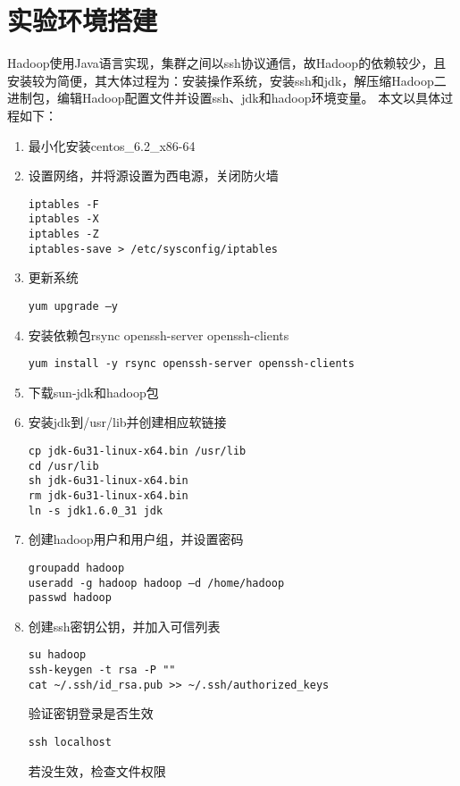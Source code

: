 \chapter[实验环境搭建]{实验环境搭建}
\label{chap:fuluA}
Hadoop使用Java语言实现，集群之间以ssh协议通信，故Hadoop的依赖较少，且安装较为简便，其大体过程为：安装操作系统，安装ssh和jdk，解压缩Hadoop二进制包，编辑Hadoop配置文件并设置ssh、jdk和hadoop环境变量。
本文以具体过程如下：
\begin{enumerate}
\item 最小化安装centos\_6.2\_x86-64

\item 设置网络，并将源设置为西电源，关闭防火墙

\begin{verbatim}
iptables -F
iptables -X
iptables -Z
iptables-save > /etc/sysconfig/iptables
\end{verbatim}
\item 更新系统

\begin{verbatim}
yum upgrade –y
\end{verbatim}
\item 安装依赖包rsync openssh-server openssh-clients

\begin{verbatim}
yum install -y rsync openssh-server openssh-clients
\end{verbatim}
\item 下载sun-jdk和hadoop包
\item 安装jdk到/usr/lib并创建相应软链接

\begin{verbatim}
cp jdk-6u31-linux-x64.bin /usr/lib
cd /usr/lib
sh jdk-6u31-linux-x64.bin
rm jdk-6u31-linux-x64.bin
ln -s jdk1.6.0_31 jdk
\end{verbatim}
\item 创建hadoop用户和用户组，并设置密码

\begin{verbatim}
groupadd hadoop
useradd -g hadoop hadoop –d /home/hadoop
passwd hadoop
\end{verbatim}
\item 创建ssh密钥公钥，并加入可信列表

\begin{verbatim}
su hadoop
ssh-keygen -t rsa -P ""
cat ~/.ssh/id_rsa.pub >> ~/.ssh/authorized_keys
\end{verbatim}
验证密钥登录是否生效

\begin{verbatim}
ssh localhost
\end{verbatim}
若没生效，检查文件权限


\end{enumerate}
